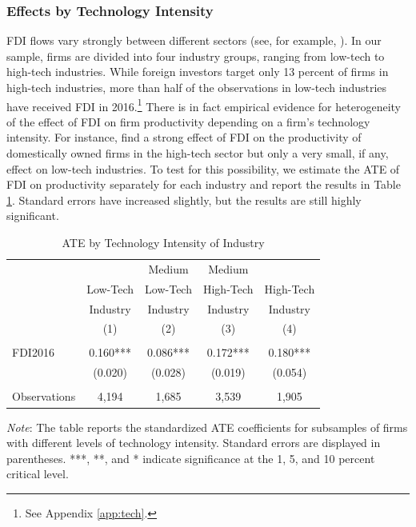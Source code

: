 \documentclass[a4paper,11pt]{scrartcl}
\begin{document}
\subsubsection*{Effects by Technology Intensity}

FDI flows vary strongly between different sectors (see, for example, \citet{Smarzynska2004, Keller2009, Haskel2007}). In our sample, firms are divided into four industry groups, ranging from low-tech to high-tech industries. While foreign investors target only 13 percent of firms in high-tech industries, more than half of the observations in low-tech industries have received FDI in 2016.\footnote{See Appendix \ref{app:tech}.} There is in fact empirical evidence for heterogeneity of the effect of FDI on firm productivity depending on a firm's technology intensity. For instance, \citet{Keller2009} find a strong effect of FDI on the productivity of domestically owned firms in the high-tech sector but only a very small, if any, effect on low-tech industries. To test for this possibility, we estimate the ATE of FDI on productivity separately for each industry and report the results in Table \ref{tab:TECH}. Standard errors have increased slightly, but the results are still highly significant. 

\begin{table}[h!]
  \centering
   \caption{ATE by Technology Intensity of Industry}
   \label{tab:TECH}
\begin{threeparttable}
 
\begin{tabular}{lcccc}
 \hline
 \hline
 & & Medium & Medium &  \\ 
 & Low-Tech & Low-Tech & High-Tech & High-Tech \\ 
 & Industry & Industry & Industry & Industry \\ 
 & (1) & (2) & (3) & (4) \\
 \hline
 &  &  &  &  \\
FDI2016 & 0.160*** & 0.086*** & 0.172*** & 0.180*** \\
	      & (0.020) & (0.028) & (0.019) & (0.054) \\
	      &  &  &  &  \\
 Observations & 4,194 & 1,685 & 3,539 & 1,905 \\ 
	\hline
	\hline
\end{tabular}	

\begin{tablenotes}[flushleft]
     \footnotesize       
\item \textit{Note}: The table reports the standardized ATE coefficients for subsamples of firms with different levels of technology intensity. Standard errors are displayed in parentheses. ***, **, and * indicate significance at the 1, 5, and 10 percent critical level. 

\end{tablenotes}


\end{threeparttable}
\end{table}
\end{document}
